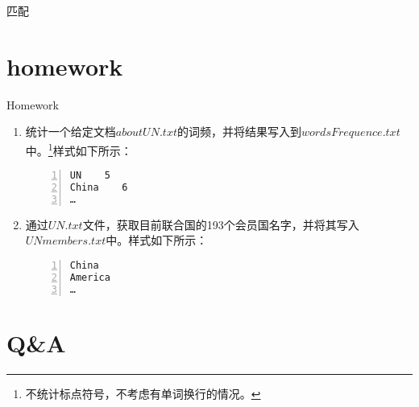 \documentclass{beamer}
\begin{document}
\begin{frame}{匹配}
\end{frame}
\section{homework}
\begin{frame}[fragile]{Homework}

\begin{enumerate}
\item
统计一个给定文档$aboutUN.txt$的词频，并将结果写入到$wordsFrequence.txt$中。\footnote{不统计标点符号，不考虑有单词换行的情况。}样式如下所示：
\begin{Verbatim}[numbers=left,frame=single,rulecolor=\color{red}]
UN    5
China    6
…
\end{Verbatim}
\item
通过$UN.txt$文件，获取目前联合国的193个会员国名字，并将其写入$UNmembers.txt$中。样式如下所示：
\begin{Verbatim}[numbers=left,frame=single,rulecolor=\color{red}]
China
America
…
\end{Verbatim}
\end{enumerate}
\end{frame}
\section{Q\&A}
\begin{frame}
\end{frame}


%
\end{document}
